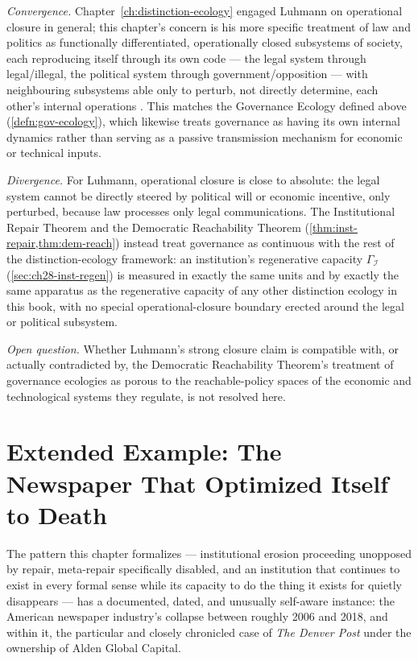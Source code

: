 \documentclass[12pt,twoside,openright]{book}
\begin{document}
\emph{Convergence.} Chapter~\ref{ch:distinction-ecology} engaged
Luhmann on operational closure in general; this chapter's concern
is his more specific treatment of law and politics as
functionally differentiated, operationally closed subsystems of
society, each reproducing itself through its own code --- the
legal system through legal/illegal, the political system through
government/opposition --- with neighbouring subsystems able only
to perturb, not directly determine, each other's internal
operations \parencite{luhmann1990}. This matches the Governance
Ecology defined above (\cref{defn:gov-ecology}), which likewise
treats governance as having its own internal dynamics rather than
serving as a passive transmission mechanism for economic or
technical inputs.

\emph{Divergence.} For Luhmann, operational closure is close to
absolute: the legal system cannot be directly steered by
political will or economic incentive, only perturbed, because law
processes only legal communications. The Institutional Repair
Theorem and the Democratic Reachability Theorem
(\cref{thm:inst-repair,thm:dem-reach}) instead treat governance as
continuous with the rest of the distinction-ecology framework: an
institution's regenerative capacity $\Gamma_\mathcal{I}$
(\cref{sec:ch28-inst-regen}) is measured in exactly the same units
and by exactly the same apparatus as the regenerative capacity of
any other distinction ecology in this book, with no special
operational-closure boundary erected around the legal or
political subsystem.

\emph{Open question.} Whether Luhmann's strong closure claim is
compatible with, or actually contradicted by, the Democratic
Reachability Theorem's treatment of governance ecologies as
porous to the reachable-policy spaces of the economic and
technological systems they regulate, is not resolved here.


\section{Extended Example: The Newspaper That Optimized Itself to
Death}
\label{sec:ch28-newspaper}

The pattern this chapter formalizes --- institutional erosion
proceeding unopposed by repair, meta-repair specifically
disabled, and an institution that continues to exist in every
formal sense while its capacity to do the thing it exists for
quietly disappears --- has a documented, dated, and unusually
self-aware instance: the American newspaper industry's collapse
between roughly 2006 and 2018, and within it, the particular and
closely chronicled case of \emph{The Denver Post} under the
ownership of Alden Global Capital.
\end{document}
